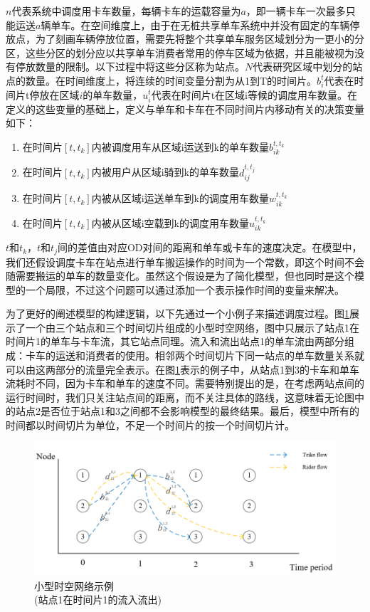 \documentclass[]{tongjithesis}
\numberwithin{equation}{chapter}
\begin{document}
$n$代表系统中调度用卡车数量，每辆卡车的运载容量为$a$，即一辆卡车一次最多只能运送$a$辆单车。在空间维度上，由于在无桩共享单车系统中并没有固定的车辆停放点，为了刻画车辆停放位置，需要先将整个共享单车服务区域划分为一更小的分区，这些分区的划分应以共享单车消费者常用的停车区域为依据，并且能被视为没有停放数量的限制。以下过程中将这些分区称为站点。$N$代表研究区域中划分的站点的数量。在时间维度上，将连续的时间变量分割为从1到T的时间片。$b_i^t$代表在时间片t停放在区域$i$的单车数量，$u_i^t$代表在时间片t在区域i等候的调度用车数量。在定义的这些变量的基础上，定义与单车和卡车在不同时间片内移动有关的决策变量如下：
\begin{enumerate}
	\item 在时间片$[t,t_k]$内被调度用车从区域i运送到k的单车数量$b_{ik}^{t,t_k}$
	\item 在时间片$[t,t_k]$内被用户从区域i骑到k的单车数量$d_{ij}^{t,t_j}$
	\item 在时间片$[t,t_k]$内被从区域i运送单车到k的调度用车数量$w_{ik}^{t,t_k}$
	\item 在时间片$[t,t_k]$内被从区域i空载到k的调度用车数量$u_{ik}^{t,t_k}$
\end{enumerate}

$t$和$t_k$，$t$和$t_j$间的差值由对应OD对间的距离和单车或卡车的速度决定。在模型中，我们还假设调度卡车在站点进行单车搬运操作的时间为一个常数，即这个时间不会随需要搬运的单车的数量变化。虽然这个假设是为了简化模型，但也同时是这个模型的一个局限，不过这个问题可以通过添加一个表示操作时间的变量来解决。

为了更好的阐述模型的构建逻辑，以下先通过一个小例子来描述调度过程。图\ref{network_example}展示了一个由三个站点和三个时间切片组成的小型时空网络，图中只展示了站点1在时间片1的单车与卡车流，其它站点同理。流入和流出站点1的单车流由两部分组成：卡车的运送和消费者的使用。相邻两个时间切片下同一站点的单车数量关系就可以由这两部分的流量完全表示。在图\ref{network_example}表示的例子中，从站点1到3的卡车和单车流耗时不同，因为卡车和单车的速度不同。需要特别提出的是，在考虑两站点间的运行时间时，我们只关注站点间的距离，而不关注具体的路线，这意味着无论图中的站点2是否位于站点1和3之间都不会影响模型的最终结果。最后，模型中所有的时间都以时间切片为单位，不足一个时间片的按一个时间切片计。
\begin{figure}[H]
	\centering
	\includegraphics[width=0.8 \textwidth]{figures_main/network_example.png}
	\caption{小型时空网络示例 \\
			 (站点1在时间片1的流入流出)
			}
	\label{network_example}
	\end{figure}
\end{document}
